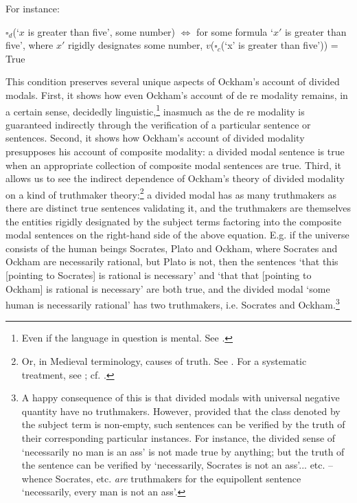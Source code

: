 \documentclass[a4paper]{article}
\begin{document}
For instance:

$\square_{d}$(`$x$ is greater than five', some number) $\Leftrightarrow$ for some formula `$x'$ is greater than five', where $x'$ rigidly designates some number, $v$($\square_{c}$(`x' is greater than five')) = True

This condition preserves several unique aspects of Ockham's account of divided modals. First, it shows how even Ockham's account of de re modality remains, in a certain sense, decidedly linguistic,\footnote{Even if the language in question is mental. See \cite{Panaccio1999}.}  inasmuch as the de re modality is guaranteed indirectly through the verification of a particular sentence or sentences. Second, it shows how Ockham's account of divided modality presupposes his account of composite modality: a divided modal sentence is true when an appropriate collection of composite modal sentences are true. Third, it allows us to see the indirect dependence of Ockham's theory of divided modality on a kind of truthmaker theory:\footnote{Or, in Medieval terminology, causes of truth. See \cite[II. 22, p. 293]{OckhamSL2}. For a systematic treatment, see \cite[I. 2]{BuridanTC}; cf. \cite[pp. 9-10]{Read2015}.}  a divided modal has as many truthmakers as there are distinct true sentences validating it, and the truthmakers are themselves the entities rigidly designated by the subject terms factoring into the composite modal sentences on the right-hand side of the above equation. E.g. if the universe consists of the human beings Socrates, Plato and Ockham, where Socrates and Ockham are necessarily rational, but Plato is not, then the sentences `that this [pointing to Socrates] is rational is necessary' and `that that [pointing to Ockham] is rational is necessary' are both true, and the divided modal `some human is necessarily rational' has two truthmakers, i.e. Socrates and Ockham.\footnote{A happy consequence of this is that divided modals with universal negative quantity have no truthmakers. However, provided that the class denoted by the subject term is non-empty, such sentences can be verified by the truth of their corresponding particular instances. For instance, the divided sense of `necessarily no man is an ass' is not made true by anything; but the truth of the sentence can be verified by `necessarily, Socrates is not an ass'... etc. – whence Socrates, etc. \textit{are} truthmakers for the equipollent sentence `necessarily, every man is not an ass'.}
\end{document}
